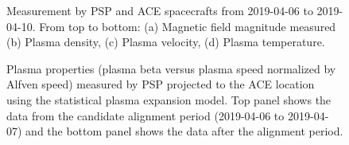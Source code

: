 \documentclass[
  letterpaper,
  DIV=11,
  numbers=noendperiod]{scrartcl}
\begin{document}
\begin{figure}


\caption{\label{fig-alignment}Measurement by PSP and ACE spacecrafts from 2019-04-06 to 2019-04-10. From top to bottom: (a) Magnetic field magnitude measured (b) Plasma density, (c) Plasma velocity, (d) Plasma temperature.}

\end{figure}%

\begin{figure}


\caption{\label{fig-evolution}Plasma properties (plasma beta versus plasma speed normalized by Alfven speed) measured by PSP projected to the ACE location using the statistical plasma expansion model. Top panel shows the data from the candidate alignment period (2019-04-06 to 2019-04-07) and the bottom panel shows the data after the alignment period.}

\end{figure}%
\end{document}
